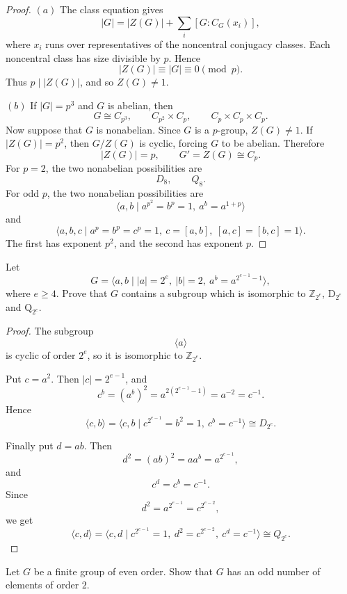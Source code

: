 \begin{proof}
\((a)\) The class equation gives
\[
    |G|
    =
    |Z(G)|+\sum_i [G:C_G(x_i)],
\]
where \(x_i\) runs over representatives of the noncentral conjugacy classes.
Each noncentral class has size divisible by \(p\). Hence
\[
    |Z(G)|\equiv |G|\equiv 0\pmod p.
\]
Thus \(p\mid |Z(G)|\), and so \(Z(G)\neq 1\).

\((b)\) If \(|G|=p^3\) and \(G\) is abelian, then
\[
    G\cong C_{p^3},\qquad
    C_{p^2}\times C_p,\qquad
    C_p\times C_p\times C_p.
\]
Now suppose that \(G\) is nonabelian. Since \(G\) is a \(p\)-group,
\(Z(G)\neq 1\). If \(|Z(G)|=p^2\), then \(G/Z(G)\) is cyclic, forcing \(G\) to
be abelian. Therefore
\[
    |Z(G)|=p,
    \qquad
    G'=Z(G)\cong C_p.
\]
For \(p=2\), the two nonabelian possibilities are
\[
    D_8,\qquad Q_8.
\]
For odd \(p\), the two nonabelian possibilities are
\[
    \langle a,b\mid a^{p^2}=b^p=1,\ a^b=a^{1+p}\rangle
\]
and
\[
    \langle a,b,c
        \mid
        a^p=b^p=c^p=1,\ c=[a,b],\ [a,c]=[b,c]=1
    \rangle.
\]
The first has exponent \(p^2\), and the second has exponent \(p\).
\end{proof}

\begin{exercise}
Let
\[
    G = \langle a,b \mid |a| = 2^e,\ |b| = 2,\ a^b = a^{2^{e-1}-1} \rangle,
\]
where \(e \geq 4\). Prove that \(G\) contains a subgroup which is isomorphic to
\(\mathbb{Z}_{2^e}\), \(\mathrm{D}_{2^e}\) and \(\mathrm{Q}_{2^e}\).
\end{exercise}

\begin{proof}
The subgroup
\[
    \langle a\rangle
\]
is cyclic of order \(2^e\), so it is isomorphic to \(\mathbb Z_{2^e}\).

Put \(c=a^2\). Then \(|c|=2^{e-1}\), and
\[
    c^b=(a^b)^2=a^{2(2^{e-1}-1)}=a^{-2}=c^{-1}.
\]
Hence
\[
    \langle c,b\rangle
    =
    \langle c,b\mid c^{2^{e-1}}=b^2=1,\ c^b=c^{-1}\rangle
    \cong D_{2^e}.
\]

Finally put \(d=ab\). Then
\[
    d^2=(ab)^2=aa^b=a^{2^{e-1}},
\]
and
\[
    c^d=c^b=c^{-1}.
\]
Since
\[
    d^2=a^{2^{e-1}}=c^{2^{e-2}},
\]
we get
\[
    \langle c,d\rangle
    =
    \langle c,d\mid c^{2^{e-1}}=1,\ d^2=c^{2^{e-2}},\ c^d=c^{-1}\rangle
    \cong Q_{2^e}.
\]
\end{proof}

\begin{exercise}
Let \(G\) be a finite group of even order. Show that \(G\) has an odd number of
elements of order \(2\).
\end{exercise}

